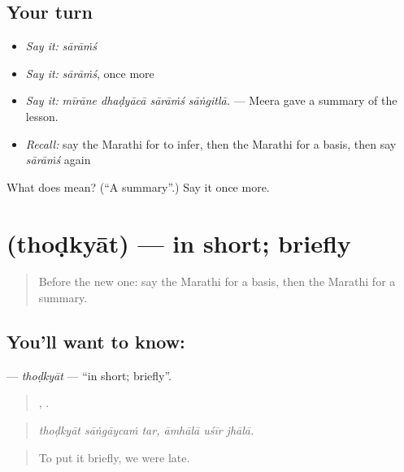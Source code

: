 \subsection*{Your turn}
\begin{itemize}
\raggedright
  \item \emph{Say it:} \emph{sārāṁś}
  \item \emph{Say it:} \emph{sārāṁś}, once more
  \item \emph{Say it:} \emph{mīrāne dhaḍyācā sārāṁś sāṅgitlā.} — Meera gave a summary of the lesson.
  \item \emph{Recall:} say the Marathi for to infer, then the Marathi for a basis, then say \emph{sārāṁś} again
\end{itemize}

\begin{tcolorbox}[breakable,colback=teal!4,colframe=teal!35!black,title={Before you move on}]
What does  mean? (\textquotedblleft{}A summary\textquotedblright{}.) Say it once more.
\end{tcolorbox}
\section[\texorpdfstring{\mr{थोडक्यात} (thoḍkyāt)}{थोडक्यात (thoḍkyāt)}]{ (thoḍkyāt) — in short; briefly}

\label{lesson:MR-C345-thodkyat}



\begin{quote}
Before the new one: say the Marathi for a basis, then the Marathi for a summary.
\end{quote}

\subsection*{You'll want to know: }
\textbf{} — \emph{thoḍkyāt} — \textquotedblleft{}in short; briefly\textquotedblright{}.

\begin{quote}
  ,   .
\end{quote}

\begin{quote}
\emph{thoḍkyāt sāṅgāycaṁ tar, āmhālā uśīr jhālā.}
\end{quote}

\begin{quote}
To put it briefly, we were late.
\end{quote}

